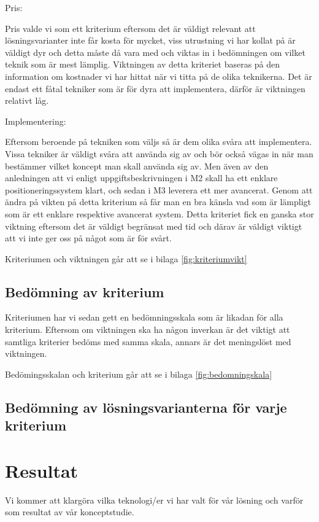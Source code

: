\documentclass[11pt, a4paper]{report}
\begin{document}
Pris:

Pris valde vi som ett kriterium eftersom det är väldigt relevant att lösningsvarianter inte får kosta för mycket, viss utrustning vi har kollat på är väldigt dyr och detta måste då vara med och viktas in i bedömningen om vilket teknik som är mest lämplig. Viktningen av detta kriteriet baseras på den information om kostnader vi har hittat när vi titta på de olika teknikerna. Det är endast ett fåtal tekniker som är för dyra att implementera, därför är viktningen relativt låg.



Implementering:

Eftersom beroende på tekniken som väljs så är dem olika svåra att implementera. Vissa tekniker är väldigt svåra att använda sig av och bör också vägas in när man bestämmer vilket koncept man skall använda sig av. Men även av den anledningen att vi enligt uppgiftsbeskrivningen i M2 skall ha ett enklare positioneringssystem klart, och sedan i M3 leverera ett mer avancerat. Genom att ändra på vikten på detta kriterium så får man en bra känsla vad som är lämpligt som är ett enklare respektive avancerat system. Detta kriteriet fick en ganska stor viktning eftersom det är väldigt begränsat med tid och därav är väldigt viktigt att vi inte ger oss på något som är för svårt.

Kriteriumen och viktningen går att se i bilaga \ref{fig:kriteriumvikt}


\section{Bedömning av kriterium}

Kriteriumen har vi sedan gett en bedömningsskala som är likadan för alla kriterium. Eftersom om viktningen ska ha någon inverkan är det viktigt att samtliga kriterier bedöms med samma skala, annars är det meningslöst med viktningen.

Bedömingsskalan och kriterium går att se i bilaga \ref{fig:bedomningskala}

\section{Bedömning av lösningsvarianterna för varje kriterium}




\chapter{Resultat}
Vi kommer att klargöra vilka teknologi/er vi har valt för vår lösning och varför som resultat av vår konceptstudie.
\end{document}
